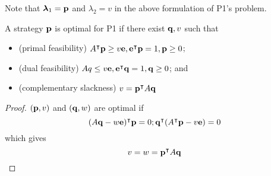 Note that \( \bm \lambda_1 = \vb p \) and \( \lambda_2 = v \) in the above formulation of P1's problem.
\begin{theorem}
	A strategy \( \vb p \) is optimal for P1 if there exist \( \vb q, v \) such that
	\begin{itemize}
		\item (primal feasibility) \( A^\intercal \vb p \geq v \vb e, \vb e^\intercal \vb p = 1, \vb p \geq 0 \);
		\item (dual feasibility) \( Aq \leq v\vb e, \vb e^\intercal \vb q = 1, \vb q \geq 0 \); and
		\item (complementary slackness) \( v = \vb p^\intercal A \vb q \)
	\end{itemize}
\end{theorem}
\begin{proof}
	\( (\vb p, v) \) and \( (\vb q, w) \) are optimal if
	\[
		(A \vb q - w \vb e)^\intercal \vb p = 0; \vb q^\intercal(A^\intercal \vb p - v \vb e) = 0
	\]
	which gives
	\[
		v = w = \vb p^\intercal A \vb q
	\]
\end{proof}

